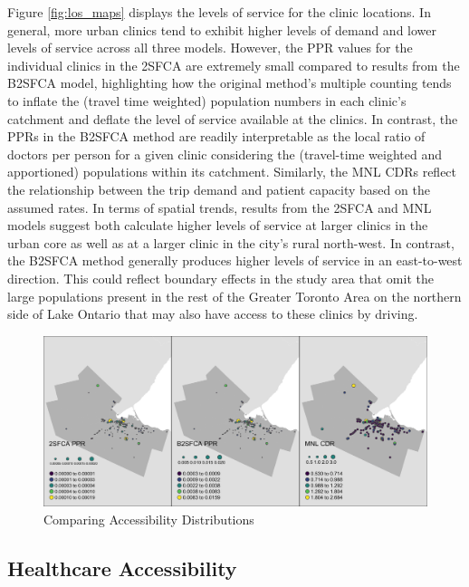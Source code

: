 \documentclass{article}
\begin{document}
Figure \ref{fig:los_maps} displays the levels of service for the clinic
locations. In general, more urban clinics tend to exhibit higher levels
of demand and lower levels of service across all three models. However,
the PPR values for the individual clinics in the 2SFCA are extremely
small compared to results from the B2SFCA model, highlighting how the
original method's multiple counting tends to inflate the (travel time
weighted) population numbers in each clinic's catchment and deflate the
level of service available at the clinics. In contrast, the PPRs in the
B2SFCA method are readily interpretable as the local ratio of doctors
per person for a given clinic considering the (travel-time weighted and
apportioned) populations within its catchment. Similarly, the MNL CDRs
reflect the relationship between the trip demand and patient capacity
based on the assumed rates. In terms of spatial trends, results from the
2SFCA and MNL models suggest both calculate higher levels of service at
larger clinics in the urban core as well as at a larger clinic in the
city's rural north-west. In contrast, the B2SFCA method generally
produces higher levels of service in an east-to-west direction. This
could reflect boundary effects in the study area that omit the large
populations present in the rest of the Greater Toronto Area on the
northern side of Lake Ontario that may also have access to these clinics
by driving.

\begin{figure}
\includegraphics[width=1\linewidth]{./img/los_maps} \caption{\label{fig:los_maps}Comparing Accessibility Distributions}\label{fig:los_maps_fig}
\end{figure}

\hypertarget{healthcare-accessibility}{%
\subsection{Healthcare Accessibility}\label{healthcare-accessibility}}
\end{document}
